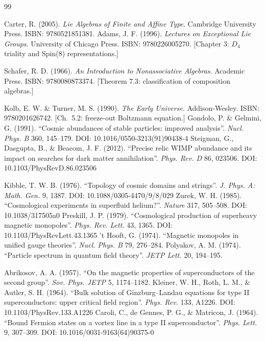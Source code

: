\documentclass[a4paper,12pt]{article}
\begin{document}
\begin{thebibliography}{99}

 Carter, R. (2005). \textit{Lie Algebras of Finite and Affine Type}. Cambridge University Press. ISBN: 9780521851381.
 Adams, J. F. (1996). \textit{Lectures on Exceptional Lie Groups}. University of Chicago Press. ISBN: 9780226005270. [Chapter 3: $D_4$ triality and Spin(8) representations.]

 Schafer, R. D. (1966). \textit{An Introduction to Nonassociative Algebras}. Academic Press. ISBN: 9780080873374. [Theorem 7.3: classification of composition algebras.]

 Kolb, E. W. \& Turner, M. S. (1990). \textit{The Early Universe}. Addison-Wesley. ISBN: 9780201626742. [Ch.~5.2: freeze-out Boltzmann equation.]
 Gondolo, P. \& Gelmini, G. (1991). ``Cosmic abundances of stable particles: improved analysis''. \textit{Nucl. Phys. B} 360, 145--179. DOI: 10.1016/0550-3213(91)90438-4
 Steigman, G., Dasgupta, B., \& Beacom, J. F. (2012). ``Precise relic WIMP abundance and its impact on searches for dark matter annihilation''. \textit{Phys. Rev. D} 86, 023506. DOI: 10.1103/PhysRevD.86.023506


 Kibble, T. W. B. (1976). ``Topology of cosmic domains and strings''. \textit{J. Phys. A: Math. Gen.} 9, 1387. DOI: 10.1088/0305-4470/9/8/029
 Zurek, W. H. (1985). ``Cosmological experiments in superfluid helium?''. \textit{Nature} 317, 505--508. DOI: 10.1038/317505a0
 Preskill, J. P. (1979). ``Cosmological production of superheavy magnetic monopoles''. \textit{Phys. Rev. Lett.} 43, 1365. DOI: 10.1103/PhysRevLett.43.1365
 't Hooft, G. (1974). ``Magnetic monopoles in unified gauge theories''. \textit{Nucl. Phys. B} 79, 276--284.
 Polyakov, A. M. (1974). ``Particle spectrum in quantum field theory''. \textit{JETP Lett.} 20, 194--195.

 Abrikosov, A. A. (1957). ``On the magnetic properties of superconductors of the second group''. \textit{Sov. Phys. JETP} 5, 1174--1182.
 Kleiner, W. H., Roth, L. M., \& Autler, S. H. (1964). ``Bulk solution of Ginzburg--Landau equations for type II superconductors: upper critical field region''. \textit{Phys. Rev.} 133, A1226. DOI: 10.1103/PhysRev.133.A1226
 Caroli, C., de Gennes, P. G., \& Matricon, J. (1964). ``Bound Fermion states on a vortex line in a type II superconductor''. \textit{Phys. Lett.} 9, 307--309. DOI: 10.1016/0031-9163(64)90375-0


\end{thebibliography}
\end{document}
